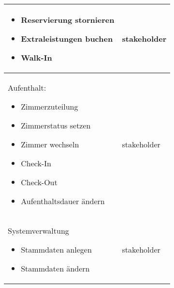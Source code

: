 \documentclass[../../Pflichtenheft.tex]{subfiles}
\begin{document}
\begin{longtable}{|p{7cm}|p{7cm}|}
\begin{itemize}
            \item Reservierung stornieren
            \item Extraleistungen buchen
            \item Walk-In
        \end{itemize}
        & stakeholder
        \\ \hline
        Aufenthalt:
        \begin{itemize}
            \item Zimmerzuteilung
            \item Zimmerstatus setzen
            \item Zimmer wechseln
            \item Check-In
            \item Check-Out
            \item Aufenthaltsdauer ändern
        \end{itemize}
        & stakeholder
        \\ \hline
        Systemverwaltung
        \begin{itemize}
            \item Stammdaten anlegen
            \item Stammdaten ändern
        \end{itemize}
        & stakeholder
        \hline
    \end{longtable}
\end{document}
